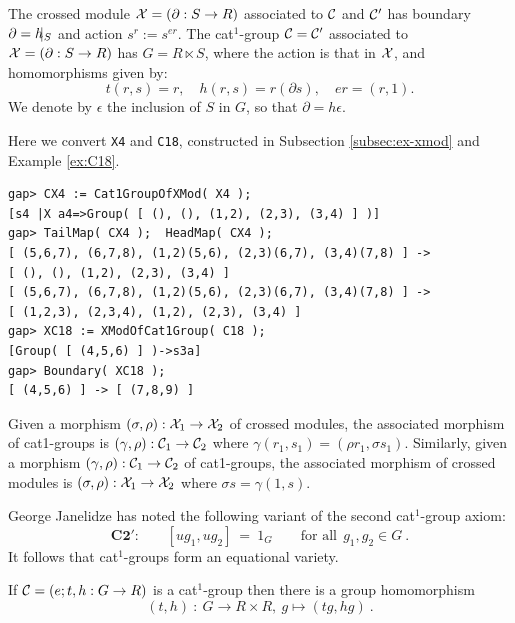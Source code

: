 The crossed module $\mathcal{X} = (\partial : S \to R)$  
associated to  $\mathcal{C}$  and  $\mathcal{C}'$  has boundary 
$\partial = h\hspace{-5pt}\mid_S$ and action $s^r := s^{er}$. 
The cat$^1$-group  $\mathcal{C} = \mathcal{C}'$  associated to  
$\mathcal{X} = (\partial : S \to R)$  has  $G = R \ltimes S$, 
where the action is that in  $\mathcal{X}$,
and homomorphisms given by:
\begin{equation} \label{eq:xmodofcat1}
t(r,s) = r, \quad h(r,s) = r(\partial s), \quad er = (r,1). 
\end{equation}
We denote by  $\epsilon$  the inclusion of  $S$  in  $G$,
so that  $\partial = h \epsilon$.

\begin{example} 
Here we convert \verb+X4+ and \verb+C18+, 
constructed in Subsection \ref{subsec:ex-xmod} and Example \ref{ex:C18}. 
{\small 
\begin{verbatim}
gap> CX4 := Cat1GroupOfXMod( X4 );
[s4 |X a4=>Group( [ (), (), (1,2), (2,3), (3,4) ] )]
gap> TailMap( CX4 );  HeadMap( CX4 );
[ (5,6,7), (6,7,8), (1,2)(5,6), (2,3)(6,7), (3,4)(7,8) ] -> 
[ (), (), (1,2), (2,3), (3,4) ]
[ (5,6,7), (6,7,8), (1,2)(5,6), (2,3)(6,7), (3,4)(7,8) ] -> 
[ (1,2,3), (2,3,4), (1,2), (2,3), (3,4) ]
gap> XC18 := XModOfCat1Group( C18 );
[Group( [ (4,5,6) ] )->s3a]
gap> Boundary( XC18 );
[ (4,5,6) ] -> [ (7,8,9) ]
\end{verbatim}} 
\end{example} 

Given a morphism 
$(\sigma,\rho) : \mathcal{X}_1 \to \mathcal{X}_2$ of crossed modules,
the associated morphism of cat1-groups is
$(\gamma,\rho) : \mathcal{C}_1 \to \mathcal{C}_2$ where
$\gamma(r_1,s_1) = (\rho r_1, \sigma s_1)$.
Similarly, given a morphism 
$(\gamma,\rho) : \mathcal{C}_1 \to \mathcal{C}_2$ of cat1-groups,
the associated morphism of crossed modules is
$(\sigma,\rho) : \mathcal{X}_1 \to \mathcal{X}_2$ where
$\sigma s = \gamma(1,s)$.


George Janelidze has noted the following variant of the second
cat$^1$-group axiom:
$$
\textbf{C2}'\textbf{:}  \qquad  
[ug_1,ug_2] ~=~ 1_G
\qquad \text{for all}~~ g_1,g_2 \in G~.
$$
It follows that cat$^1$-groups form an equational variety.

\begin{lem}
If  $\mathcal{C} = (e;t,h : G \to R )$  is a cat$^1$-group
then there is a group homomorphism
$$
(t,h) ~:~ G \to R \times R, ~ g \mapsto (tg,hg)~.
$$
\end{lem}


